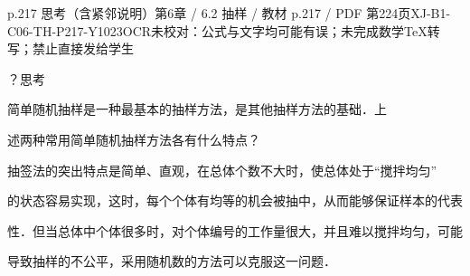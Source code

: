 \begin{bankitem}{p.217 思考（含紧邻说明）}{第6章 / 6.2 抽样 / 教材 p.217 / PDF 第224页}{XJ-B1-C06-TH-P217-Y1023}{OCR未校对：公式与文字均可能有误；未完成数学TeX转写；禁止直接发给学生}
\begin{ocrdraft}
\par
？思考
\par
简单随机抽样是一种最基本的抽样方法，是其他抽样方法的基础．上
\par
述两种常用简单随机抽样方法各有什么特点？
\par
抽签法的突出特点是简单、直观，在总体个数不大时，使总体处于“搅拌均匀”
\par
的状态容易实现，这时，每个个体有均等的机会被抽中，从而能够保证样本的代表
\par
性．但当总体中个体很多时，对个体编号的工作量很大，并且难以搅拌均匀，可能
\par
导致抽样的不公平，采用随机数的方法可以克服这一问题．
\end{ocrdraft}
\end{bankitem}
